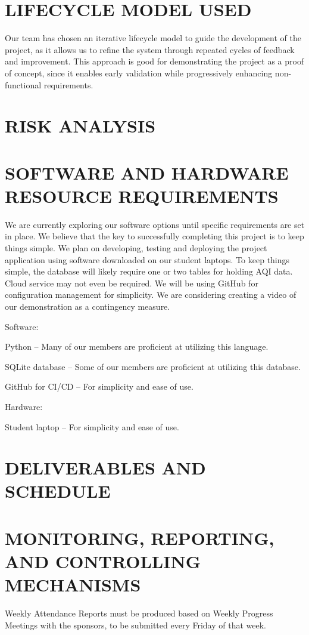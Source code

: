 \documentclass[11pt]{article}
\begin{document}
\section{LIFECYCLE MODEL USED}
Our team has chosen an iterative lifecycle model to guide the development of the project, as it allows us to refine the system through repeated cycles of feedback and improvement. This approach is good for demonstrating the project as a proof of concept, since it enables early validation while progressively enhancing non-functional requirements.

\section{RISK ANALYSIS}
\section{SOFTWARE AND HARDWARE RESOURCE REQUIREMENTS}
We are currently exploring our software options until specific requirements are set in place. We believe that the key to successfully completing this project is to keep things simple. We plan on developing, testing and deploying the project application using software downloaded on our student laptops. To keep things simple, the database will likely require one or two tables for holding AQI data. Cloud service may not even be required. We will be using GitHub for configuration management for simplicity. We are considering creating a video of our demonstration as a contingency measure.

Software:

Python – Many of our members are proficient at utilizing this language.

SQLite database – Some of our members are proficient at utilizing this database.

GitHub for CI/CD – For simplicity and ease of use.

Hardware:

Student laptop – For simplicity and ease of use.

\section{DELIVERABLES AND SCHEDULE}
\section{MONITORING, REPORTING, AND CONTROLLING MECHANISMS}
Weekly Attendance Reports must be produced based on Weekly Progress Meetings with the sponsors, to be submitted every Friday of that week.
\end{document}
